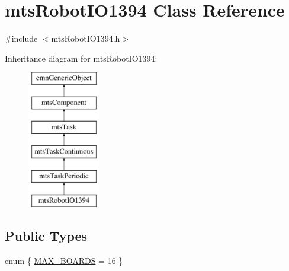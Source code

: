 \hypertarget{classmts_robot_i_o1394}{}\section{mts\+Robot\+I\+O1394 Class Reference}
\label{classmts_robot_i_o1394}


{\ttfamily \#include $<$mts\+Robot\+I\+O1394.\+h$>$}

Inheritance diagram for mts\+Robot\+I\+O1394\+:\begin{figure}[H]
\begin{center}
\leavevmode
\includegraphics[height=6.000000cm]{d3/d42/classmts_robot_i_o1394}
\end{center}
\end{figure}
\subsection*{Public Types}
\begin{DoxyCompactItemize}
\item 
enum \{ \hyperlink{classmts_robot_i_o1394_ab5384b5b8420c5f6c51cca571de64e71ae14ba9547603419cc36292983705a60d}{M\+A\+X\+\_\+\+B\+O\+A\+R\+D\+S} = 16
 \}
\end{DoxyCompactItemize}
